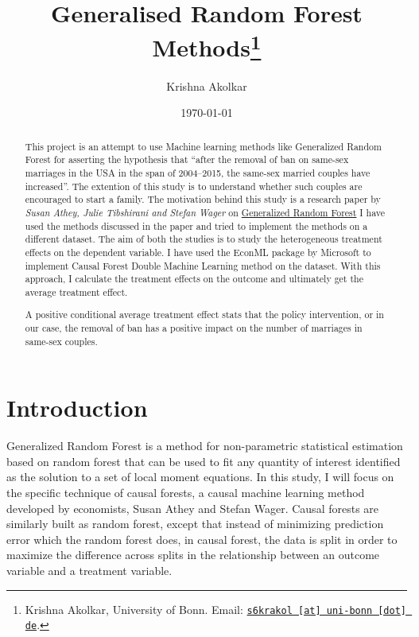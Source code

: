 \documentclass[11pt, a4paper, leqno]{article}
\begin{document}
\title{Generalised Random Forest Methods\thanks{Krishna Akolkar, University of Bonn. Email: \href{mailto:s6krakol@uni-bonn.de}{\nolinkurl{s6krakol [at] uni-bonn [dot] de}}.}}

\author{Krishna Akolkar}

\date{
    \today
}
\maketitle
\begin{abstract}
    This project is an attempt to use Machine learning methods like Generalized Random Forest for asserting the hypothesis that
    ``after the removal of ban on same-sex marriages in the USA in the span of 2004--2015, the same-sex married couples have increased''.
    The extention of this study is to understand whether such couples are encouraged to start a family.
    The motivation behind this
    study is a research paper by \textit{Susan Athey, Julie Tibshirani and Stefan Wager} on \href{https://arxiv.org/pdf/1610.01271}{Generalized Random Forest}
    I have used the methods discussed in the paper and tried to implement the methods on a different dataset.
    The aim of both the studies is to study the heterogeneous treatment effects on the dependent variable.
    I have used the EconML package by Microsoft to implement Causal Forest Double Machine Learning method on the dataset.
    With this approach, I calculate the treatment effects on the outcome and ultimately get the average treatment effect.

    A positive conditional average treatment effect stats that the policy intervention, or in our case, the removal of ban has a positive
    impact on the number of marriages in same-sex couples.
\end{abstract}

\clearpage

\section{Introduction}\label{sec:introduction}

 Generalized Random Forest is a method for non-parametric statistical estimation based on random forest that can be used to fit any quantity
 of interest identified as the solution to a set of local moment equations.
 In this study, I will focus on the specific technique of causal forests, a causal machine learning method developed by economists, Susan Athey and Stefan Wager.
 Causal forests are similarly built as random forest, except that instead of minimizing prediction error which the random forest does, in causal forest, the data is split in order to
 maximize the difference across splits in the relationship between an outcome variable and a treatment variable.
\end{document}
